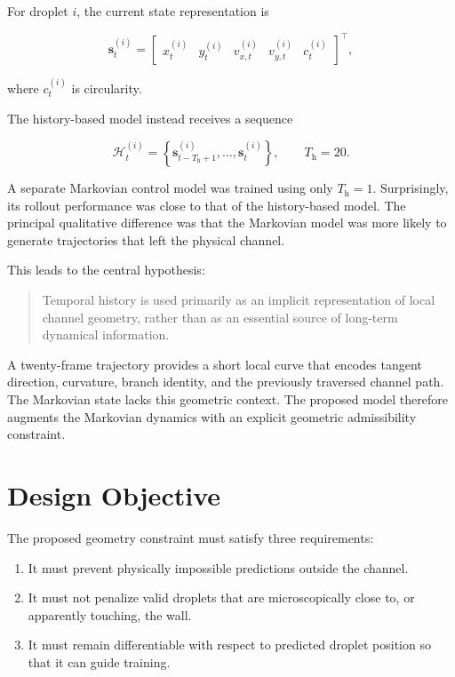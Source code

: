 \documentclass[11pt]{article}
\begin{document}
For droplet $i$, the current state representation is

\begin{equation}
    \bm{s}_{t}^{(i)}
    =
    \begin{bmatrix}
        x_{t}^{(i)} &
        y_{t}^{(i)} &
        v_{x,t}^{(i)} &
        v_{y,t}^{(i)} &
        c_{t}^{(i)}
    \end{bmatrix}^{\!\top},
\end{equation}

where $c_{t}^{(i)}$ is circularity.

The history-based model instead receives a sequence

\begin{equation}
    \mathcal{H}_{t}^{(i)}
    =
    \left\{
    \bm{s}_{t-T_{\mathrm{h}}+1}^{(i)},
    \ldots,
    \bm{s}_{t}^{(i)}
    \right\},
    \qquad
    T_{\mathrm{h}}=20.
\end{equation}

A separate Markovian control model was trained using only $T_{\mathrm{h}}=1$. Surprisingly, its rollout performance was close to that of the history-based model. The principal qualitative difference was that the Markovian model was more likely to generate trajectories that left the physical channel.

This leads to the central hypothesis:

\begin{quote}
Temporal history is used primarily as an implicit representation of local channel geometry, rather than as an essential source of long-term dynamical information.
\end{quote}

A twenty-frame trajectory provides a short local curve that encodes tangent direction, curvature, branch identity, and the previously traversed channel path. The Markovian state lacks this geometric context. The proposed model therefore augments the Markovian dynamics with an explicit geometric admissibility constraint.

\section{Design Objective}

The proposed geometry constraint must satisfy three requirements:

\begin{enumerate}[leftmargin=1.8em]
    \item It must prevent physically impossible predictions outside the channel.
    \item It must not penalize valid droplets that are microscopically close to, or apparently touching, the wall.
    \item It must remain differentiable with respect to predicted droplet position so that it can guide training.
\end{enumerate}
\end{document}
